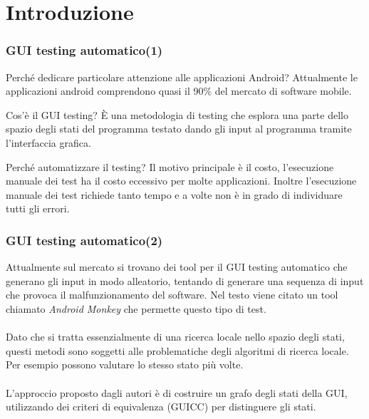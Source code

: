 \documentclass[12pt]{beamer}
\begin{document}
\section{Introduzione}
\begin{frame}
    \frametitle{GUI testing automatico(1)}
    \begin{block}{Perch\'e dedicare particolare attenzione alle applicazioni Android?}
        Attualmente le applicazioni android comprendono quasi il 90\% del mercato di software mobile.

    \end{block}
    \begin{block}{Cos'\`e il GUI testing?}
        \`E una metodologia di testing che esplora una parte dello spazio degli stati del programma testato dando gli input al programma tramite l'interfaccia grafica.
    \end{block}
    \begin{block}{Perch\'e automatizzare il testing?}
        Il motivo principale \`e il costo, l'esecuzione manuale dei test ha il costo eccessivo per molte applicazioni.
        Inoltre l'esecuzione manuale dei test richiede tanto tempo e a volte non \`e in grado di individuare tutti gli errori.
    \end{block}


\end{frame}

\begin{frame}
    \frametitle{GUI testing automatico(2)}
Attualmente sul mercato si trovano dei tool per il GUI testing automatico che generano gli input in modo alleatorio, tentando di generare una sequenza di input che provoca il malfunzionamento del software.
Nel testo viene citato un tool chiamato \emph{Android Monkey} che permette questo tipo di test.
\\~\\
Dato che si tratta essenzialmente di una ricerca locale nello spazio degli stati, questi metodi sono soggetti alle problematiche degli algoritmi di ricerca locale. Per esempio possono valutare lo stesso stato pi\`u volte.
\\~\\
L'approccio proposto dagli autori \`e di costruire un grafo degli stati della GUI, utilizzando dei criteri di equivalenza (GUICC) per distinguere gli stati.
\end{frame}
\end{document}
